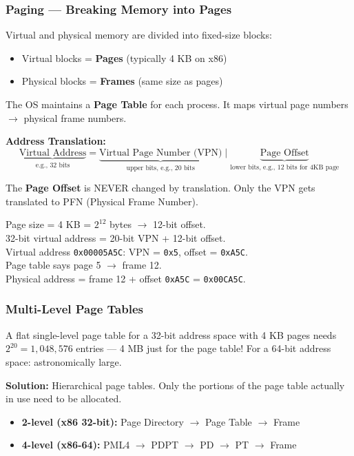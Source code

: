 \documentclass[11pt,a4paper]{article}
\newcommand{\term}[1]{\textbf{\color{darkblue}#1}}
\begin{document}
\subsubsection{Paging --- Breaking Memory into Pages}

Virtual and physical memory are divided into fixed-size blocks:
\begin{itemize}[noitemsep]
  \item Virtual blocks = \term{Pages} (typically 4 KB on x86)
  \item Physical blocks = \term{Frames} (same size as pages)
\end{itemize}

The OS maintains a \term{Page Table} for each process. It maps virtual page numbers $\to$ physical frame numbers.

\textbf{Address Translation:}
\[
\underbrace{\text{Virtual Address}}_{\text{e.g., 32 bits}} = \underbrace{\text{Virtual Page Number (VPN)}}_{\text{upper bits, e.g., 20 bits}} \;\Big|\; \underbrace{\text{Page Offset}}_{\text{lower bits, e.g., 12 bits for 4KB page}}
\]

The \textbf{Page Offset} is NEVER changed by translation. Only the VPN gets translated to PFN (Physical Frame Number).

\begin{myexample}
Page size = 4 KB = $2^{12}$ bytes $\to$ 12-bit offset.\\
32-bit virtual address = 20-bit VPN + 12-bit offset.\\
Virtual address \texttt{0x00005A5C}: VPN = \texttt{0x5}, offset = \texttt{0xA5C}.\\
Page table says page 5 $\to$ frame 12.\\
Physical address = frame 12 + offset \texttt{0xA5C} = \texttt{0x00CA5C}.
\end{myexample}

\subsubsection{Multi-Level Page Tables}

A flat single-level page table for a 32-bit address space with 4 KB pages needs $2^{20} = 1{,}048{,}576$ entries --- 4 MB just for the page table! For a 64-bit address space: astronomically large.

\textbf{Solution:} Hierarchical page tables. Only the portions of the page table actually in use need to be allocated.

\begin{itemize}[noitemsep]
  \item \textbf{2-level (x86 32-bit):} Page Directory $\to$ Page Table $\to$ Frame
  \item \textbf{4-level (x86-64):} PML4 $\to$ PDPT $\to$ PD $\to$ PT $\to$ Frame
\end{itemize}
\end{document}
